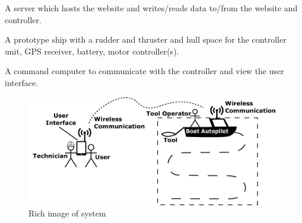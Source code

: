 A server which hosts the website and writes/reads data to/from the website and controller.

A prototype ship with a rudder and thruster and hull space for the controller unit, GPS receiver, battery, motor controller(s).

A command computer to communicate with the controller and view the user interface.

\begin{figure}[H]
	\centering
	\includegraphics[width=0.9\linewidth]{../Appendix/Project/Dokumentation/Images/Introduction/rich_image}
	\caption{Rich image of system}
	\label{table:rich_image}
\end{figure}


